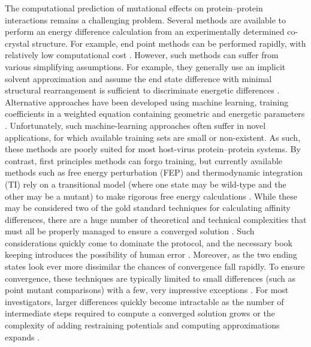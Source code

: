\documentclass[12pt]{article}
\begin{document}
The computational prediction of mutational effects on protein--protein interactions remains a challenging problem. Several methods are available to perform an energy difference calculation from an experimentally determined co-crystal structure. For example, end point methods can be performed rapidly, with relatively low computational cost \citep{Grant2011,Kortemme2004}. However, such methods can suffer from various simplifying assumptions. For example, they generally use an implicit solvent approximation and assume the end state difference with minimal structural rearrangement is sufficient to discriminate energetic differences \citep{Grant2011,Kortemme2004}. Alternative approaches have been developed using machine learning, training coefficients in a weighted equation containing geometric and energetic parameters \citep{Vreven2011,Vreven2012,Bajaj2011,Hwang2010}. Unfortunately, such machine-learning approaches often suffer in novel applications, for which available training sets are small or non-existent. As such, these methods are poorly suited for most host-virus protein--protein systems. By contrast, first principles methods can forgo training, but currently available methods such as free energy perturbation (FEP) and thermodynamic integration (TI) rely on a transitional model (where one state may be wild-type and the other may be a mutant) to make rigorous free energy calculations  \citep{Gilson1997,Lu2004,Chodera2011,Gumbart2013}. While these may be considered two of the gold standard techniques for calculating affinity differences, there are a huge number of theoretical and technical complexities that must all be properly managed to ensure a converged solution \citep{Gumbart2013b}. Such considerations quickly come to dominate the protocol, and the necessary book keeping introduces the possibility of human error \citep{Gumbart2013b}. Moreover, as the two ending states look ever more dissimilar the chances of convergence fall rapidly. To ensure convergence, these techniques are typically limited to small differences (such as point mutant comparisons) with a few, very impressive exceptions \citep{Wang2006,Gumbart2013,Gumbart2013b}. For most investigators, larger differences quickly become intractable as the number of intermediate steps required to compute a converged solution grows or the complexity of adding restraining potentials and computing approximations expands \citep{Wang2006,Gumbart2013,Gumbart2013b}.
\end{document}
